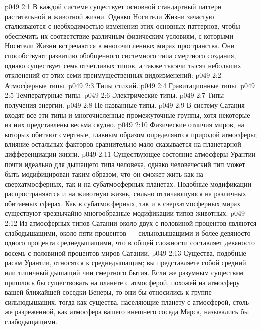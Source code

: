 \vs p049 2:1 В каждой системе существует основной стандартный паттерн растительной и животной жизни. Однако Носители Жизни зачастую сталкиваются с необходимостью изменения этих основных паттернов, чтобы обеспечить их соответствие различным физическим условиям, с которыми Носители Жизни встречаются в многочисленных мирах пространства. Они способствуют развитию обобщенного системного типа смертного создания, однако существует семь отчетливых типов, а также тысячи тысяч небольших отклонений от этих семи преимущественных видоизменений:
\vs p049 2:2 \bibnobreakspace Атмосферные типы.
\vs p049 2:3 \bibnobreakspace Типы стихий.
\vs p049 2:4 \bibnobreakspace Гравитационные типы.
\vs p049 2:5 \bibnobreakspace Температурные типы.
\vs p049 2:6 \bibnobreakspace Электрические типы.
\vs p049 2:7 \bibnobreakspace Типы получения энергии.
\vs p049 2:8 \bibnobreakspace Не названные типы.
\vs p049 2:9 \pc В систему Сатания входят все эти типы и многочисленные промежуточные группы, хотя некоторые из них представлены весьма скудно.
\vs p049 2:10 \bibnobreakspace {} Физические отличия миров, на которых обитают смертные, главным образом определяются природой атмосферы; влияние остальных факторов сравнительно мало сказывается на планетарной дифференциации жизни.
\vs p049 2:11 Существующее состояние атмосферы Урантии почти идеально для дышащего типа человека, однако человеческий тип может быть модифицирован таким образом, что он сможет жить как на сверхатмосферных, так и на субатмосферных планетах. Подобные модификации распространяются и на животную жизнь, сильно отличающуюся на различных обитаемых сферах. Как в субатмосферных, так и в сверхатмосферных мирах существуют чрезвычайно многообразные модификации типов животных.
\vs p049 2:12 Из атмосферных типов Сатании около двух с половиной процентов являются слабодышащими, около пяти процентов --- сильнодышащими и более девяносто одного процента среднедышащими, что в общей сложности составляет девяносто восемь с половиной процентов миров Сатании.
\vs p049 2:13 Существа, подобные расам Урантии, относятся к среднедышащим; вы представляете собой средний или типичный дышащий чин смертного бытия. Если же разумным существам пришлось бы существовать на планете с атмосферой, похожей на атмосферу вашей ближайшей соседки Венеры, то они бы относились к группе сильнодышащих, тогда как существа, населяющие планету с атмосферой, столь же разреженной, как атмосфера вашего внешнего соседа Марса, назывались бы слабодыщащими.
